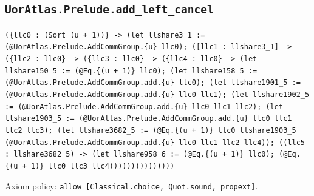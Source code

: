 \documentclass[11pt]{article}
\begin{document}
\subsection*{\texttt{UorAtlas.Prelude.add\_left\_cancel}}
\noindent\texttt{(\{llc0 : (Sort (u + 1))\} -> (let llshare3\_1 := (@UorAtlas.Prelude.AddCommGroup.\{u\} llc0); ([llc1 : llshare3\_1] -> (\{llc2 : llc0\} -> (\{llc3 : llc0\} -> (\{llc4 : llc0\} -> (let llshare150\_5 := (@Eq.\{(u + 1)\} llc0); (let llshare158\_5 := (@UorAtlas.Prelude.AddCommGroup.add.\{u\} llc0); (let llshare1901\_5 := (@UorAtlas.Prelude.AddCommGroup.add.\{u\} llc0 llc1); (let llshare1902\_5 := (@UorAtlas.Prelude.AddCommGroup.add.\{u\} llc0 llc1 llc2); (let llshare1903\_5 := (@UorAtlas.Prelude.AddCommGroup.add.\{u\} llc0 llc1 llc2 llc3); (let llshare3682\_5 := (@Eq.\{(u + 1)\} llc0 llshare1903\_5 (@UorAtlas.Prelude.AddCommGroup.add.\{u\} llc0 llc1 llc2 llc4)); ((llc5 : llshare3682\_5) -> (let llshare958\_6 := (@Eq.\{(u + 1)\} llc0); (@Eq.\{(u + 1)\} llc0 llc3 llc4)))))))))))))))}\par
\noindent Axiom policy: \texttt{allow [Classical.choice, Quot.sound, propext]}.\par
\end{document}
